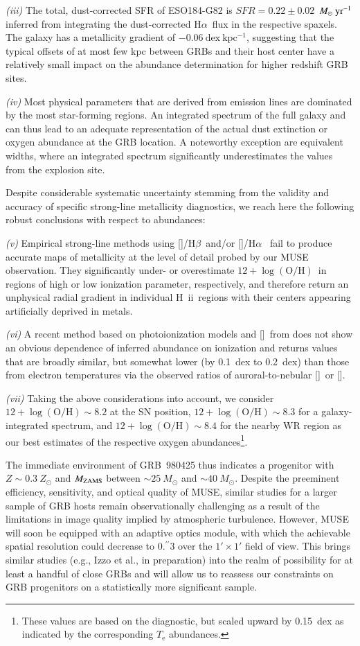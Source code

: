 \documentclass[traditabstract]{aa}
\newcommand{\farc}{\hbox{$.\!\!^{\prime\prime}$}}
\newcommand{\hb}{H$\beta$}
\newcommand{\ha}{H$\alpha$}
\newcommand{\hii}{\mbox{H~{\sc ii}}}
\newcommand{\oh}{12+\log(\mathrm{O/H})}
\newcommand{\sii}{[\ion{S}{ii}]}
\newcommand{\siii}{[\ion{S}{iii}]}
\newcommand{\oiii}{[\ion{O}{iii}]}
\newcommand{\nii}{[\ion{N}{ii}]}
\newcommand{\Msunyr}{$M_\odot~\rm{yr}^{-1}$}
\begin{document}
\textit{(iii)} The total, dust-corrected SFR of ESO184-G82 is $SFR=0.22\pm0.02$~\Msunyr inferred from integrating the dust-corrected \ha~flux in the respective spaxels. The galaxy has a metallicity gradient of $-0.06~\mathrm{dex~kpc^{-1}}$, suggesting that the typical offsets of at most few kpc between GRBs and their host center have a relatively small impact on the abundance determination for higher redshift GRB sites.

\textit{(iv)} Most physical parameters that are derived from emission lines are dominated by the most star-forming regions. An integrated spectrum of the full galaxy and can thus lead to an adequate representation of the actual dust extinction or oxygen abundance at the GRB location. A noteworthy exception are equivalent widths, where an integrated spectrum significantly underestimates the values from the explosion site.

Despite considerable systematic uncertainty stemming from the validity and accuracy of specific strong-line metallicity diagnostics, we reach here the following robust conclusions with respect to abundances:

\textit{(v)} Empirical strong-line methods using \oiii/\hb~and/or \nii/\ha~ fail to produce accurate maps of metallicity at the level of detail probed by our MUSE observation. They significantly under- or overestimate $\oh$~in regions of high or low ionization parameter, respectively, and therefore return an unphysical radial gradient in individual \hii\  regions with their centers appearing artificially deprived in metals.

\textit{(vi)} A recent method based on photoionization models and \sii~from \citet{2016Ap&SS.361...61D} does not show an obvious dependence of inferred abundance on ionization and returns values that are broadly similar, but somewhat lower (by 0.1~dex to 0.2~dex) than those from electron temperatures via the observed ratios of auroral-to-nebular \siii~or \oiii. 

\textit{(vii)} Taking the {above} considerations into account, we consider {$\oh\sim8.2$} at the SN position, $\oh\sim8.3$ for a galaxy-integrated spectrum, and $\oh\sim8.4$ for the nearby WR region as our best estimates of the respective oxygen abundances\footnote{{These values are based on the \citet{2016Ap&SS.361...61D} diagnostic, but scaled upward by 0.15~dex as indicated by the corresponding $T_{\mathrm{e}}$ abundances.}}.

The immediate environment of GRB~980425 thus indicates a progenitor with $Z\sim0.3~Z_\odot$ and $M_{\rm{ZAMS}}$ between $\sim25~M_{\odot}$ and $\sim40~M_{\odot}$. Despite the preeminent efficiency, sensitivity, and optical quality of MUSE, similar studies for a larger sample of GRB hosts remain observationally challenging as a result of the limitations in image quality implied by atmospheric turbulence. However, MUSE will soon be equipped with an adaptive optics module, with which the achievable spatial resolution could decrease to 0\farc{3} over the $1'\times1'$ field of view. This brings similar studies {(e.g., Izzo et al., in preparation)} into the realm of possibility for at least a handful of close GRBs and will allow us to reassess our constraints on GRB progenitors on a statistically more significant sample.
\end{document}

